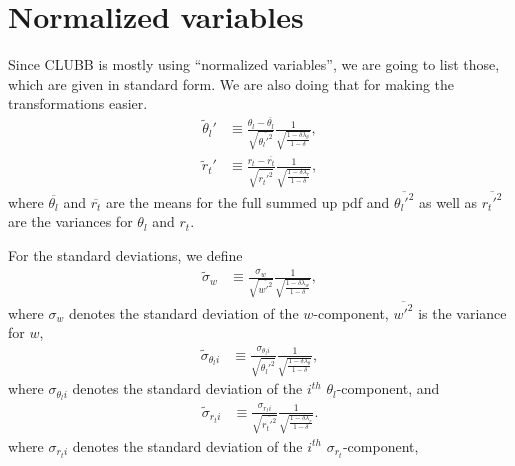 \section{Normalized variables}\label{sec:normvars}

Since \gls{CLUBB} is mostly using \enquote{normalized variables},
we are going to list those, which are given in standard form.
We are also doing that for making the transformations easier.
\begin{align}
    \label{eq:theta_l_prime_tilde}
    \tilde{\theta}_l'
    &\equiv \frac{\theta_l - \overline{\theta_l}}{\sqrt{\overline{\theta_l'^2}}}
    \frac{1}{\sqrt{\frac{1 - \delta \lambda_\theta}{1 - \delta}}},
\end{align}
\begin{align}
    \label{eq:r_t_prime_tilde}
    \tilde{r}_t'
    &\equiv \frac{r_t - \overline{r_t}}{\sqrt{\overline{r_t'^2}}}
    \frac{1}{\sqrt{\frac{1 - \delta \lambda_r}{1 - \delta}}},
\end{align}
where $\overline{\theta_l}$ and $\overline{r_t}$ are the means for the full summed up \gls{pdf}
and $\overline{\theta_l'^2}$ as well as $\overline{r_t'^2}$ are the variances for $\theta_l$ and $r_t$.

For the standard deviations, we define
\begin{align}
    \label{eq:sigma_w_tilde}
    \tilde{\sigma}_w
    &\equiv \frac{\sigma_w}{\sqrt{\overline{w'^2}}}
    \frac{1}{\sqrt{\frac{1-\delta\lambda_w}{1-\delta}}},
\end{align}
where $\sigma_w$ denotes the standard deviation of the $w$-component,
$\overline{w'^2}$ is the variance for $w$,
\begin{align}
    \label{eq:sigma_theta_l_i_tilde}
    \tilde{\sigma}_{\theta_l i}
    &\equiv \frac{\sigma_{\theta_l i}}{\sqrt{\overline{\theta_l'^2}}}
    \frac{1}{\sqrt{\frac{1-\delta\lambda_\theta}{1-\delta}}},
\end{align}
where $\sigma_{\theta_l i}$ denotes the standard deviation of the $i^{th}$ $\theta_l$-component,
and
\begin{align}
    \label{eq:sigma_r_t_i_tilde}
    \tilde{\sigma}_{r_t i}
    &\equiv \frac{\sigma_{r_t i}}{\sqrt{\overline{r_t'^2}}}
    \frac{1}{\sqrt{\frac{1-\delta\lambda_r}{1-\delta}}}.
\end{align}
where $\sigma_{r_t i}$ denotes the standard deviation of the $i^{th}$ $\sigma_{r_t}$-component,